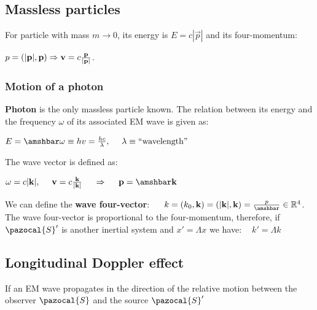 \subsection{Massless particles}
For particle with mass $m\to 0$, its energy is $E=c|\vec{p}|$ and its four-momentum:\\
\centerline{$p=(|\mathbf{p}|,\mathbf{p})\Rightarrow \mathbf{v}=c\frac{\mathbf{p}}{|\mathbf{p}|}$.}




\subsubsection*{Motion of a photon}
\textbf{Photon} is the only massless particle known. The relation between its energy and the frequency $\omega$ of its associated EM wave is given as:\\
\centerline{$E= \amshbar\omega\equiv hv=\frac{hc}{\lambda},\ \ \ \ \lambda\equiv\text{``wavelength''}$}
The wave vector is defined as:\\
\centerline{$\omega=c|\vec{k}|,\ \ \ \ \vec{v}=c\frac{\vec{k}}{|\vec{k}|}\ \ \ \ \then\ \ \ \ \vec{p}= \amshbar\vec{k}$}
We can define the \textbf{wave four-vector}: $\ \ \ \ k=(k_{0},\vec{k})=(|\vec{k}|,\vec{k})=\frac{p}{ \amshbar}\in\R^{4}$.
The wave four-vector is proportional to the four-momentum, therefore, if $\pazocal{S}'$ is another inertial system and $x'=\Lambda x$ we have: $\ \ \ \ k'=\Lambda k$


\subsection{Longitudinal Doppler effect}
If an EM wave propagates in the direction of the relative motion between the observer $\pazocal{S}$ and the source $\pazocal{S}'$






















































